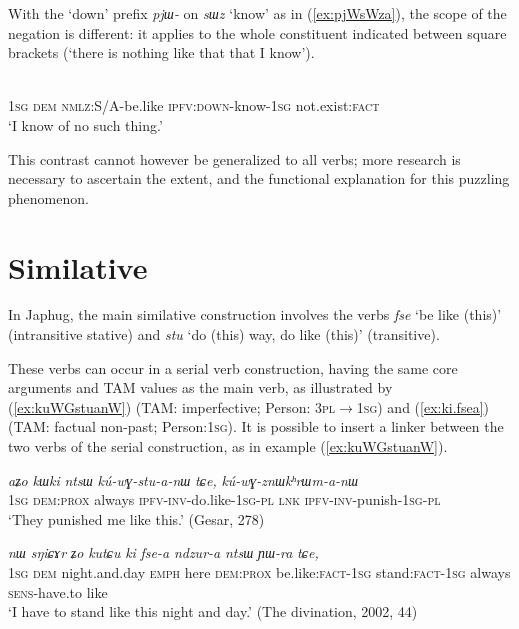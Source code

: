 \documentclass[oneside,a4paper,12pt]{article}
\newcommand{\ipa}[1]{{\phon\textit{#1}}}
\newcommand{\forme}[2]{\ipa{#1} `#2'}
\begin{document}
With the `down' prefix \ipa{pjɯ-} on \forme{sɯz}{know} as in (\ref{ex:pjWsWza}), the scope of the negation is different: it applies to the whole constituent indicated between square brackets (`there is nothing like that that I know').

\begin{exe}
\ex \label{ex:pjWsWza}
\gll [\ipa{aʑo} 	\ipa{nɯ} 	\ipa{kɯ-fse} 	\ipa{pjɯ-sɯz-a}]	\ipa{me} \\
\textsc{1sg} \textsc{dem} \textsc{nmlz}:S/A-be.like \textsc{ipfv:down}-know-\textsc{1sg} not.exist:\textsc{fact} \\
\glt `I know of no such thing.'
\end{exe}

This contrast cannot however be generalized to all verbs; more research is necessary to ascertain the extent, and the functional explanation for this puzzling phenomenon.

\section{Similative} \label{sec:similative}
In Japhug, the main similative construction involves the verbs \forme{fse}{be like (this)} (intransitive stative) and \forme{stu}{do (this) way, do like (this)} (transitive).

These verbs can occur in a serial verb construction, having the same core arguments and TAM values as the main verb, as illustrated by  (\ref{ex:kuWGstuanW}) (TAM: imperfective; Person: \textsc{3pl$\rightarrow$1sg}) and (\ref{ex:ki.fsea}) (TAM: factual non-past; Person:\textsc{1sg}).  It is possible to insert a linker between the two verbs of the serial construction, as in example (\ref{ex:kuWGstuanW}). 

\begin{exe}
\ex \label{ex:kuWGstuanW}
\gll 	
 \ipa{aʑo} 	\ipa{kɯki} 	\ipa{ntsɯ} 	\ipa{kú-wɣ-stu-a-nɯ} 	\ipa{tɕe,} 	\ipa{kú-wɣ-znɯkʰrɯm-a-nɯ} \\
 \textsc{1sg} \textsc{dem:prox} always \textsc{ipfv-inv}-do.like-\textsc{1sg-pl} \textsc{lnk} \textsc{ipfv-inv}-punish-\textsc{1sg-pl} \\
 \glt `They punished me like this.' (Gesar, 278)
\end{exe}	


\begin{exe}
\ex \label{ex:ki.fsea}
\gll \ipa{aʑo} 	\ipa{nɯ} 	\ipa{sŋiɕɤr} 	\ipa{ʑo} 	\ipa{kutɕu} 	\ipa{ki} 	\ipa{fse-a} 	\ipa{ndzur-a} 	\ipa{ntsɯ} 	\ipa{ɲɯ-ra} 	\ipa{tɕe,} \\
\textsc{1sg} \textsc{dem} night.and.day \textsc{emph} here \textsc{dem:prox} be.like:\textsc{fact-1sg} stand:\textsc{fact-1sg} always \textsc{sens}-have.to like \\
\glt `I have to stand like this night and day.' (The divination, 2002, 44)
\end{exe}
\end{document}
